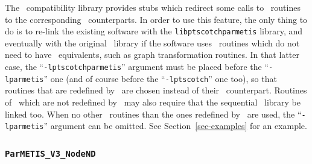 The \parmetis\ compatibility library provides stubs which redirect some
calls to \parmetis\ routines to the corresponding \ptscotch\ counterparts.
In order to use this feature, the only thing to do is to re-link the
existing software with the {\tt lib\lbo ptscotch\lbo parmetis} library, and
eventually with the original \parmetis\ library if the software uses
\parmetis\ routines which do not need to have \ptscotch\ equivalents, such
as graph transformation routines.
In that latter case, the ``{\tt -lptscotch\lbt parmetis}'' argument must be
placed before the ``{\tt -lparmetis}'' one (and of course before the
``{\tt -lptscotch}'' one too), so that routines that are redefined by
\ptscotch\ are chosen instead of their \parmetis\ counterpart. Routines
of \parmetis\ which are not redefined by \ptscotch\ may also require
that the sequential \metis\ library be linked too. When no other
\parmetis\ routines than the ones redefined by \ptscotch\ are used,
the ``{\tt -lparmetis}'' argument can be omitted. See
Section~\ref{sec-examples} for an example.

\subsubsection{{\tt ParMETIS\_V3\_NodeND}}

